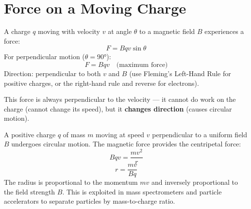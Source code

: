 \section{Force on a Moving Charge}

\begin{lawbox}
A charge $q$ moving with velocity $v$ at angle
$\theta$ to a magnetic field $B$ experiences a force:
\[
  F = Bqv\sin\theta
\]
For perpendicular motion ($\theta = 90°$):
\[
  F = Bqv \quad \text{(maximum force)}
\]
Direction: perpendicular to both $v$ and $B$
(use Fleming's Left-Hand Rule for positive charges,
or the right-hand rule and reverse for electrons).

This force is always perpendicular to the velocity
--- it cannot do work on the charge (cannot change
its speed), but it \textbf{changes direction}
(causes circular motion).
\end{lawbox}

\begin{processbox}
A positive charge $q$ of mass $m$ moving at speed
$v$ perpendicular to a uniform field $B$ undergoes
circular motion. The magnetic force provides the
centripetal force:
\[
  Bqv = \frac{mv^2}{r}
\]
\[
  r = \frac{mv}{Bq}
\]
The radius is proportional to the momentum $mv$ and
inversely proportional to the field strength $B$.
This is exploited in mass spectrometers and particle
accelerators to separate particles by mass-to-charge
ratio.
\end{processbox}

